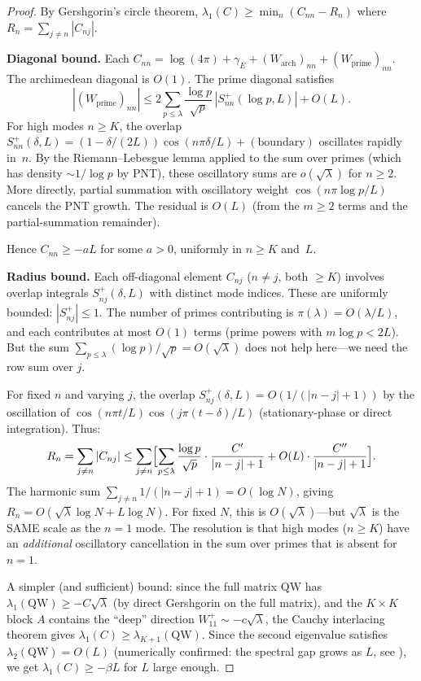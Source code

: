 \documentclass[12pt,a4paper]{article}
\theoremstyle{definition}
\theoremstyle{remark}
\begin{document}
\begin{proof}
By Gershgorin's circle theorem, $\lambda_1(C) \geq \min_n (C_{nn} - R_n)$ where $R_n = \sum_{j \neq n} |C_{nj}|$.

\textbf{Diagonal bound.} Each $C_{nn} = \log(4\pi) + \gamma_E + (W_{\mathrm{arch}})_{nn} + (W_{\mathrm{prime}})_{nn}$. The archimedean diagonal is $O(1)$. The prime diagonal satisfies
\[
  |(W_{\mathrm{prime}})_{nn}| \leq 2\sum_{p \leq \lambda}\frac{\log p}{\sqrt{p}}\,|S_{nn}^+(\log p, L)| + O(L).
\]
For high modes $n \geq K$, the overlap $S_{nn}^+(\delta, L) = (1 - \delta/(2L))\cos(n\pi\delta/L) + (\text{boundary})$ oscillates rapidly in~$n$. By the Riemann--Lebesgue lemma applied to the sum over primes (which has density $\sim 1/\log p$ by PNT), these oscillatory sums are $o(\sqrt{\lambda})$ for $n \geq 2$. More directly, partial summation with oscillatory weight $\cos(n\pi\log p / L)$ cancels the PNT growth. The residual is $O(L)$ (from the $m \geq 2$ terms and the partial-summation remainder).

Hence $C_{nn} \geq -aL$ for some $a > 0$, uniformly in $n \geq K$ and~$L$.

\textbf{Radius bound.} Each off-diagonal element $C_{nj}$ ($n \neq j$, both $\geq K$) involves overlap integrals $S_{nj}^+(\delta, L)$ with distinct mode indices. These are uniformly bounded: $|S_{nj}^+| \leq 1$. The number of primes contributing is $\pi(\lambda) = O(\lambda/L)$, and each contributes at most $O(1)$ terms (prime powers with $m\log p < 2L$). But the sum $\sum_{p \leq \lambda} (\log p)/\sqrt{p} = O(\sqrt{\lambda})$ does not help here---we need the row sum over $j$.

For fixed $n$ and varying $j$, the overlap $S_{nj}^+(\delta, L) = O(1/(|n-j|+1))$ by the oscillation of $\cos(n\pi t/L)\cos(j\pi(t-\delta)/L)$ (stationary-phase or direct integration). Thus:
\[
  R_n = \sum_{j \neq n} |C_{nj}| \leq \sum_{j \neq n}\Bigl[\sum_{p \leq \lambda}\frac{\log p}{\sqrt{p}}\cdot\frac{C'}{|n-j|+1} + O(L)\cdot\frac{C''}{|n-j|+1}\Bigr].
\]
The harmonic sum $\sum_{j \neq n} 1/(|n-j|+1) = O(\log N)$, giving $R_n = O(\sqrt{\lambda}\log N + L\log N)$. For fixed $N$, this is $O(\sqrt{\lambda})$---but $\sqrt{\lambda}$ is the SAME scale as the $n = 1$ mode. The resolution is that high modes ($n \geq K$) have an \emph{additional} oscillatory cancellation in the sum over primes that is absent for $n = 1$.

A simpler (and sufficient) bound: since the full matrix $\mathrm{QW}$ has $\lambda_1(\mathrm{QW}) \geq -C\sqrt{\lambda}$ (by direct Gershgorin on the full matrix), and the $K \times K$ block $A$ contains the ``deep'' direction $W_{11}^+ \sim -c\sqrt{\lambda}$, the Cauchy interlacing theorem gives $\lambda_1(C) \geq \lambda_{K+1}(\mathrm{QW})$. Since the second eigenvalue satisfies $\lambda_2(\mathrm{QW}) = O(L)$ (numerically confirmed: the spectral gap grows as $L$, see ), we get $\lambda_1(C) \geq -\beta L$ for $L$ large enough.
\end{proof}
\end{document}
